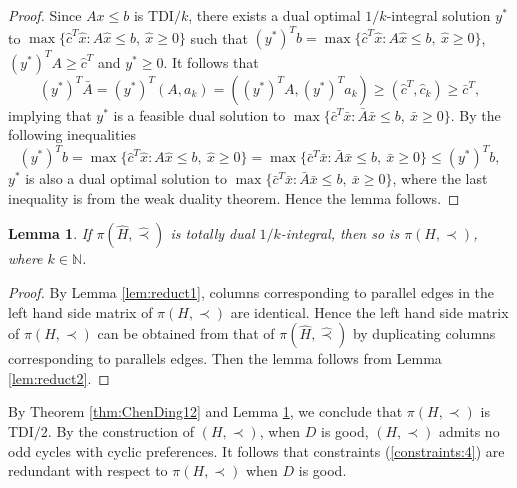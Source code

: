 \documentclass[11pt]{article}
\newtheorem{lemma}[theorem]{Lemma}
\numberwithin{theorem}{section}
\begin{document}
\begin{proof}
Since $Ax\leq b$ is TDI$/k$, there exists a dual optimal $1/k$-integral solution $y^*$ to $\max\{\hat{c}^T\hat{x}:A\hat{x}\leq b,~\hat{x}\geq 0\}$ such that $(y^*)^T b=\max\{\hat{c}^T \hat{x}:A\hat{x}\leq b,~\hat{x}\geq 0\}$, $(y^*)^T A\geq \hat{c}^T$ and $y^*\geq 0$. It follows that
\begin{equation*}
(y^*)^T \bar{A}=(y^*)^T (A,a_k)=((y^*)^T A,(y^*)^T a_k)\geq (\hat{c}^T,\hat{c}_k)\geq\bar{c}^T,
\end{equation*}
implying that $y^*$ is a feasible dual solution to $\max\{\bar{c}^T \bar{x}:\bar{A}\bar{x}\leq b,~\bar{x}\geq 0\}$. By the following inequalities
\begin{equation*}
(y^*)^T b=\max\{\hat{c}^T \hat{x}:A\hat{x}\leq b,~\hat{x}\geq 0\}=\max\{\bar{c}^T \bar{x}:\bar{A}\bar{x}\leq b,~\bar{x}\geq 0\}\leq (y^*)^T b,
\end{equation*} $y^*$ is also a dual optimal solution to $\max\{\bar{c}^T \bar{x}:\bar{A}\bar{x}\leq b,~\bar{x}\geq 0\}$, where the last inequality is from the weak duality theorem. Hence the lemma follows.
\end{proof}

\begin{lemma}
\label{lem:reduct3}
If $\pi(\hat{H},\hat\prec)$ is totally dual $1/k$-integral, then so is $\pi(H,\prec)$, where $k\in\mathbb{N}$.
\end{lemma}
\begin{proof}
By Lemma \ref{lem:reduct1}, columns corresponding to parallel edges in the left hand side matrix of $\pi(H,\prec)$ are identical. Hence the left hand side matrix of $\pi(H,\prec)$ can be obtained from that of $\pi(\hat{H},\hat\prec)$ by duplicating columns corresponding to parallels edges. Then the lemma follows from Lemma \ref{lem:reduct2}.
\end{proof}

By Theorem \ref{thm:ChenDing12} and Lemma \ref{lem:reduct3}, we conclude that $\pi(H,\prec)$ is TDI$/2$. By the construction of $(H,\prec)$, when $D$ is good, $(H,\prec)$ admits no odd cycles with cyclic preferences. It follows that constraints (\ref{constraints:4}) are redundant with respect to $\pi(H,\prec)$ when $D$ is good.
\end{document}
